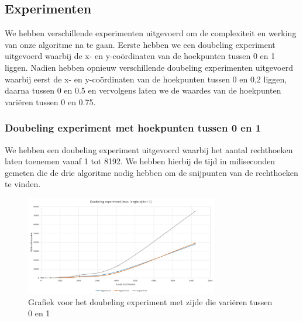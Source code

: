 \documentclass[11pt,a4paper,titlepage]{article}
\begin{document}
		\subsection{Experimenten}
		We hebben verschillende experimenten uitgevoerd om de complexiteit en werking van onze algoritme na te gaan. Eerste hebben we een doubeling experiment uitgevoerd waarbij de x- en y-coördinaten van de hoekpunten tussen 0 en 1 liggen.  Nadien hebben opnieuw verschillende doubeling experimenten uitgevoerd waarbij eerst de x- en y-coördinaten van de hoekpunten tussen 0 en 0,2 liggen, daarna tussen 0 en 0.5 en vervolgens laten we de waardes van de hoekpunten variëren tussen 0 en 0.75.
			\subsubsection{Doubeling experiment met hoekpunten tussen 0 en 1}
				We hebben een doubeling experiment uitgevoerd waarbij het aantal rechthoeken laten toenemen vanaf 1 tot 8192.  We hebben hierbij de tijd in miliseconden gemeten die de drie algoritme nodig hebben om de snijpunten van de rechthoeken te vinden.
				\begin{figure}[H]
				\centering
				\includegraphics[width=0.75\textwidth]{zijde1.JPG}
				\caption{\label{fig:convR}Grafiek voor het doubeling experiment met zijde die variëren tussen 0 en 1}
				\end{figure}
\end{document}
